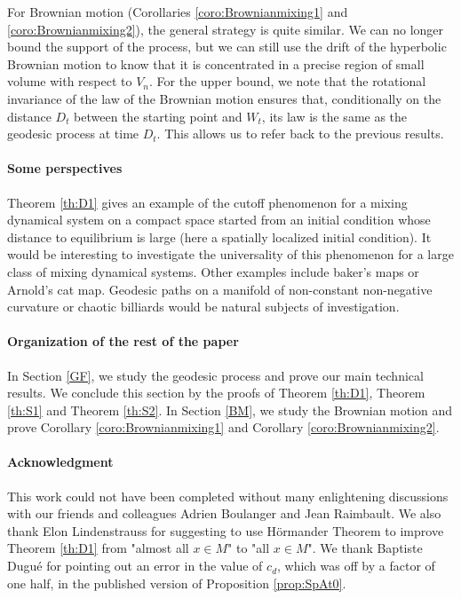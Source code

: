 \documentclass[]{scrartcl}
\numberwithin{equation}{section}
\numberwithin{figure}{section}
\begin{document}
	For Brownian motion (Corollaries  \ref{coro:Brownianmixing1} and \ref{coro:Brownianmixing2}),  the general strategy is quite similar.
	We can no longer bound the support of the process, but we can still use the drift of the hyperbolic Brownian motion to know that it is concentrated in a precise region of small volume with respect to $V_n$.
	For the upper bound, we note that the rotational invariance of the law of the Brownian motion ensures that, conditionally on the distance $D_t$ between the starting point and $W_t$, its law is the same as the geodesic process at time $D_t$. This allows us to refer back to the previous results.

\paragraph{Some perspectives} Theorem \ref{th:D1} gives an example of the cutoff phenomenon for a mixing dynamical system on a compact space started from an initial condition whose distance to equilibrium is large (here a spatially localized initial condition). It would be interesting to investigate the universality of this phenomenon for a large class of mixing dynamical systems. Other examples include baker's maps or Arnold's cat map. Geodesic paths on a manifold of non-constant non-negative curvature or chaotic billiards would be natural subjects of investigation. 

\paragraph{Organization of the rest of the paper}

In Section \ref{GF}, we study the geodesic process and prove our main technical results. We conclude this section by the proofs of Theorem \ref{th:D1}, Theorem \ref{th:S1} and Theorem \ref{th:S2}. In Section \ref{BM}, we study the Brownian motion and prove Corollary \ref{coro:Brownianmixing1} and Corollary \ref{coro:Brownianmixing2}.



	\paragraph{Acknowledgment} This work could not have been completed without many enlightening discussions with our friends and colleagues Adrien Boulanger and Jean Raimbault. We also thank Elon Lindenstrauss for suggesting to use H{\"o}rmander Theorem to improve Theorem \ref{th:D1} from "almost all $x \in M$" to "all $x \in M$". We thank Baptiste Dugué for pointing out an error in the value of $c_d$, which was off by a factor of one half, in the published version of Proposition \ref{prop:SpAt0}.
		
\end{document}
